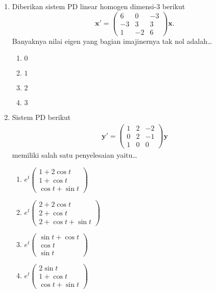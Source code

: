 \documentclass[a4paper]{article}
\theoremstyle{definisi}
\numberwithin{equation}{section}
\begin{document}
  \begin{enumerate}
    \item Diberikan sistem PD linear homogen dimensi-$3$ berikut
    \[\mathbf{x'} = \begin{pmatrix}
      6 & 0 & -3\\
      -3 & 3 & 3\\
      1 & -2 & 6
    \end{pmatrix}\mathbf{x}.\]
    Banyaknya nilai eigen yang bagian imajinernya tak nol adalah\dots
    
    \begin{enumerate}[label=\Alph*.]
      \item $0$
      \item $1$
      \item $2$
      \item $3$
    \end{enumerate}

    \item Sistem PD berikut
    \begin{align*}
      \mathbf{y'} = \begin{pmatrix}
        1&2&-2\\
        0&2&-1\\
        1&0&0
      \end{pmatrix}\mathbf{y}
    \end{align*}
    memiliki salah satu penyelesaian yaitu\dots
    \begin{enumerate}[label=\Alph*.]
      \item $e^t\begin{pmatrix}1+2\cos t\\1+\cos t\\\cos t+\sin t\end{pmatrix}$
      \item $e^t\begin{pmatrix}2+2\cos t\\2+\cos t\\2+\cos t+\sin t\end{pmatrix}$
      \item $e^t\begin{pmatrix}\sin t+\cos t\\\cos t\\\sin t\end{pmatrix}$
      \item $e^t\begin{pmatrix}2\sin t\\1+\cos t\\\cos t+\sin t\end{pmatrix}$
    \end{enumerate}


\end{enumerate}
\end{document}
